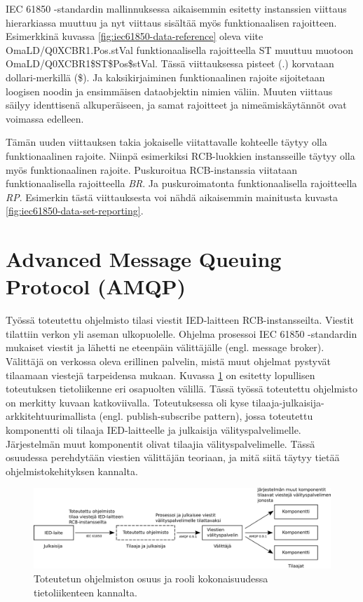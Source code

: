 IEC 61850 -standardin mallinnuksessa aikaisemmin esitetty instanssien viittaus hierarkiassa muuttuu ja nyt viittaus sisältää myös funktionaalisen rajoitteen. Esimerkkinä kuvassa \ref{fig:iec61850-data-reference} oleva viite OmaLD/Q0XCBR1.Pos.stVal funktionaalisella rajoitteella ST muuttuu muotoon OmaLD/Q0XCBR1\$ST\$Pos\$stVal. Tässä viittauksessa pisteet (.) korvataan dollari-merkillä (\$). Ja kaksikirjaiminen funktionaalinen rajoite sijoitetaan loogisen noodin ja ensimmäisen dataobjektin nimien väliin. Muuten viittaus säilyy identtisenä alkuperäiseen, ja samat rajoitteet ja nimeämiskäytännöt ovat voimassa edelleen. \mbox{\cite[s.~34--35, 111]{IEC61850-8-1}}

Tämän uuden viittauksen takia jokaiselle viitattavalle kohteelle täytyy olla funktionaalinen rajoite. Niinpä esimerkiksi RCB-luokkien instansseille täytyy olla myös funktionaalinen rajoite. Puskuroitua RCB-instanssia viitataan funktionaalisella rajoitteella \emph{BR}. Ja puskuroimatonta funktionaalisella rajoitteella \emph{RP}. Esimerkin tästä viittauksesta voi nähdä aikaisemmin mainitusta kuvasta \ref{fig:iec61850-data-set-reporting}. \mbox{\cite[s.~32--34, 75]{IEC61850-8-1}}


\section{Advanced Message Queuing Protocol (AMQP)}
\label{ch:amqp-theory}
Työssä toteutettu ohjelmisto tilasi viestit IED-laitteen RCB-instansseilta. Viestit tilattiin verkon yli aseman ulkopuolelle. Ohjelma prosessoi IEC 61850 -standardin mukaiset viestit ja lähetti ne eteenpäin välittäjälle (engl. message broker). Välittäjä on verkossa oleva erillinen palvelin, mistä muut ohjelmat pystyvät tilaamaan viestejä tarpeidensa mukaan. Kuvassa \ref{fig:implemented-system-communication} on esitetty lopullisen toteutuksen tietoliikenne eri osapuolten välillä. Tässä työssä toteutettu ohjelmisto on merkitty kuvaan katkoviivalla. Toteutuksessa oli kyse tilaaja-julkaisija-arkkitehtuurimallista (engl. publish-subscribe pattern), jossa toteutettu komponentti oli tilaaja IED-laitteelle ja julkaisija välityspalvelimelle. Järjestelmän muut komponentit olivat tilaajia välityspalvelimelle. Tässä osuudessa perehdytään viestien välittäjän teoriaan, ja mitä siitä täytyy tietää ohjelmistokehityksen kannalta.

\begin{figure}[ht!]
	\includegraphics[width=1\textwidth]{pictures/implemented-system-communication.png}
	\caption{Toteutetun ohjelmiston osuus ja rooli kokonaisuudessa tietoliikenteen kannalta.}
	\label{fig:implemented-system-communication}
\end{figure}

